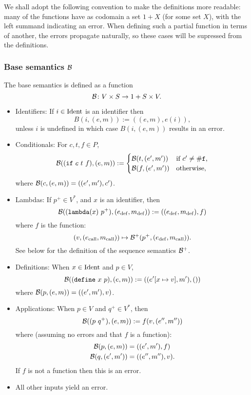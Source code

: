We shall adopt the following convention to make the definitions more readable:
many of the functions have as codomain a set $1 + X$ (for some set $X$), with
the left summand indicating an error. When defining such a partial function in
terms of another, the errors propagate naturally, so these cases will be
supressed from the definitions.

\subsubsection{Base semantics $\mathcal{B}$}

The base semantics is defined as a function
\[
\mathcal{B} \colon V \times S \to 1 + S \times V.
\]
\begin{itemize}
\item Identifiers: If $i \in \mathrm{Ident}$ is an identifier then
  \[
    B(i,(e,m)) := ((e,m),e(i)),
  \]
  unless $i$ is undefined in which case $B(i, (e,m))$ results in an
  error.
\item Conditionals: For $c,t,f \in P$,
  \[
    \mathcal{B}( (\mathtt{if} \ c \ t \ f), (e,m)) :=
    \begin{cases}
      \mathcal{B}(t, (e', m')) & \text{if $c' \neq \mathtt{\#f}$,}\\
      \mathcal{B}(f, (e', m')) & \text{otherwise,}
    \end{cases}
  \]
  where $\mathcal{B}(c, (e,m)) = ((e',m'), c')$.
\item
  \def\defe{\mathrm{def}}
  \def\calle{\mathrm{call}}
  \def\rete{\mathrm{rete}}
  Lambdas: If $p^+ \in V^*$, and $x$ is an identifier, then
  \[
    \B((\mathtt{lambda} (x) \ p^+), (e_\defe, m_\defe)) :=
    ((e_\defe,m_\defe), f)
  \]
  where $f$ is the function:
  \[
    (v, (e_\calle,m_\calle)) \mapsto \B^+(p^+, (e_\defe, m_\calle)).
  \]
  See below for the definition of the sequence semantics $\mathcal{B}^+$.
\item Definitions: When $x \in \mathrm{Ident}$ and $p \in V$,
\[
\mathcal{B}((\mathtt{define} \ x \ p), (e,m)) := ((e'[x \mapsto v], m'), ())
\]
where $\mathcal{B}(p, (e,m)) = ((e', m'), v)$.
\item Applications: When $p \in V$ and $q^+ \in V^*$, then
\[
\mathcal{B}((p \ q^+), (e,m)) := f(v, (e'',m''))
\]
where (assuming no errors and that $f$ is a function):
\begin{align*}
  \mathcal{B}(p, (e,m)) &= ((e',m'), f)\\
  \mathcal{B}(q, (e',m')) &= ((e'',m''), v).
\end{align*}
If $f$ is not a function then this is an error.
\item All other inputs yield an error.
\end{itemize}

